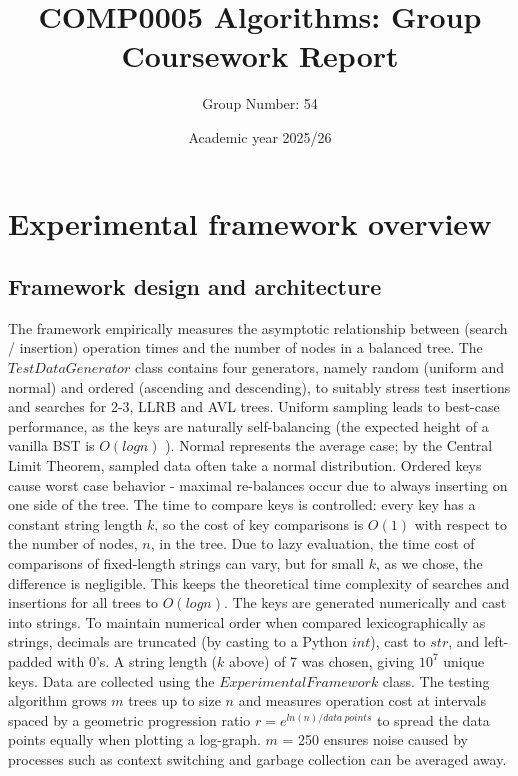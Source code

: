 \documentclass[12pt]{article}
\begin{document}
\title{COMP0005 Algorithms: Group Coursework Report}
\author{Group Number: 54}
\date{Academic year 2025/26}
\maketitle
\vspace{-4em}
\section{Experimental framework overview}

\subsection{Framework design and architecture}
The framework empirically measures the asymptotic relationship between (search / insertion) operation times and the number of nodes in a balanced tree.
The $TestDataGenerator$ class contains four generators, namely random (uniform and normal) and ordered (ascending and descending), to suitably stress test insertions and searches for 2-3, LLRB and AVL trees.
Uniform sampling leads to best-case performance, as the keys are naturally self-balancing (the expected height of a vanilla BST is $O(logn)$ \cite{algorithms}).
Normal represents the average case; by the Central Limit Theorem, sampled data often take a normal distribution.
Ordered keys cause worst case behavior - maximal re-balances occur due to always inserting on one side of the tree.
The time to compare keys is controlled: every key has a constant string length $k$, so the cost of key comparisons is $O(1)$ with respect to the number of nodes, $n$, in the tree.
Due to lazy evaluation, the time cost of comparisons of fixed-length strings can vary, but for small $k$, as we chose, the difference is negligible.
This keeps the theoretical time complexity of searches and insertions for all trees to $O(logn)$.
The keys are generated numerically and cast into strings. To maintain numerical order when compared lexicographically as strings, decimals are truncated (by casting to a Python $int$), cast to $str$, and left-padded with 0's.
A string length ($k$ above) of 7 was chosen, giving $10^7$ unique keys.
Data are collected using the $ExperimentalFramework$ class.
The testing algorithm grows $m$ trees up to size $n$ and measures operation cost at intervals spaced by a geometric progression ratio $r=e^{ln(n)/data \ points}$ to spread the data points equally when plotting a log-graph.
$m$ = 250 ensures noise caused by processes such as context switching and garbage collection can be averaged away.
\end{document}
